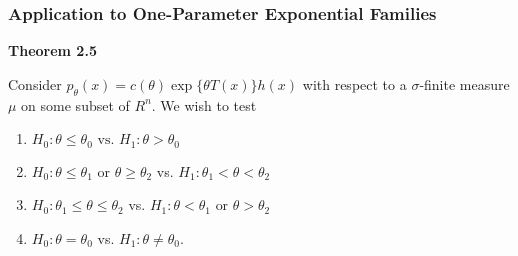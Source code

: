 \documentclass[12pt]{article}
\numberwithin{equation}{section}
\begin{document}
\newpage
\subsubsection{Application to One-Parameter Exponential Families}
\textbf{Theorem 2.5}

Consider $p_{\theta}(x) = c(\theta) \exp\{ \theta T(x) \} h(x)$ with respect to a $\sigma$-finite measure $\mu$ on some subset of $R^n$. We wish to test
\begin{enumerate}[(1)]
  \item $H_0: \theta \le \theta_0 \text{ vs. } H_1: \theta > \theta_0$
  \item $H_0: \theta \le \theta_1 \text{ or } \theta \ge \theta_2$ vs. $H_1: \theta_1 < \theta < \theta_2$
  \item $H_0: \theta_1 \le \theta \le \theta_2$ vs. $H_1: \theta < \theta_1 \text{ or } \theta > \theta_2$
  \item $H_0: \theta = \theta_0$ vs. $H_1: \theta \ne \theta_0$. 
\end{enumerate}
\end{document}
